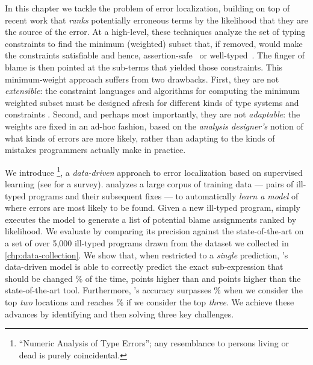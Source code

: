 In this chapter we tackle the problem of error localization,
building on top of recent work that \emph{ranks} potentially
erroneous terms by the likelihood that they are the source
of the error.
%
At a high-level, these techniques analyze
the set of typing constraints to find
the minimum (weighted) subset that,
if removed, would make the constraints
satisfiable and hence, assertion-safe~\citep{Jose2011-se}
or well-typed~\citep{Zhang2014-lv,Loncaric2016-uk,Chen2014-gd,Pavlinovic2014-mr}.
The finger of blame is then pointed at the
sub-terms that yielded those constraints.
%
This minimum-weight approach suffers
from two drawbacks.
%
First, they are not \emph{extensible}:
the constraint languages and algorithms for computing
the minimum weighted subset must be
designed afresh for different kinds
of type systems and constraints \citep{Loncaric2016-uk}.
%
Second, and perhaps most importantly,
they are not \emph{adaptable}: the
weights are fixed in an ad-hoc fashion, based on the
\emph{analysis designer's} notion
of what kinds of errors are more
likely, rather than
adapting to the kinds of mistakes
programmers actually make in practice.

%
We introduce \toolname
\footnote{``Numeric Analysis of Type Errors''; any resemblance to persons living or dead is purely coincidental.},
a \emph{data-driven} approach to error
localization based on supervised
learning (see \citealt{Kotsiantis2007-pj} for a survey).
%
\toolname analyzes a large corpus
of training data --- pairs of ill-typed
programs and their subsequent fixes ---
to automatically \emph{learn a model}
of where errors are most likely to
be found.
%
Given a new ill-typed program,
\toolname simply executes the model
to generate a list of potential
blame assignments ranked by likelihood.
%
We evaluate \toolname by comparing its
precision against the state-of-the-art
on a set of over 5,000 ill-typed \ocaml
programs drawn from the dataset we
collected in \autoref{chp:data-collection}.
%
We show that, when restricted to a
\emph{single} prediction, \toolname's data-driven
model is able to correctly predict
the exact sub-expression that should
be changed \HiddenFhTopOne\% of the time,
\ToolnameWinOcaml points higher than \ocaml and
\ToolnameWinSherrloc points higher than the state-of-the-art
\sherrloc tool.
%
Furthermore, \toolname's accuracy surpasses
\HiddenFhTopTwo\% when we consider the top \emph{two}
locations and reaches \HiddenFhTopThree\% if we consider
the top \emph{three}.
%
We achieve these advances by identifying
and then solving three key challenges.

